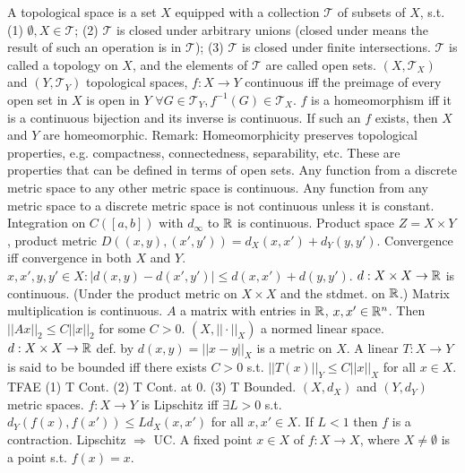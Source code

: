  A topological space is
a set $X$ equipped with a collection $\mathcal{T}$ of subsets of $X$, s.t.
(1) $\emptyset, X \in \mathcal{T}$;
(2) $\mathcal{T}$ is closed under arbitrary unions (closed under means the result of such an operation is in $\mathcal{T}$);
(3) $\mathcal{T}$ is closed under finite intersections.
$\mathcal{T}$ is called a topology on $X$, and the elements of $\mathcal{T}$ are called open sets.
$(X, \mathcal{T}_X)$ and $(Y, \mathcal{T}_Y)$ topological spaces,
$f: X \to Y$ continuous iff the preimage of every open set in $X$ is open in $Y$
$\forall G \in \mathcal{T}_Y, f^{-1}(G) \in \mathcal{T}_X$.
 $f$ is a homeomorphism iff
it is a continuous bijection and its inverse is continuous.
If such an $f$ exists, then $X$ and $Y$ are homeomorphic.
Remark: Homeomorphicity preserves topological properties,
e.g. compactness, connectedness, separability, etc.
These are properties that can be defined in terms of open sets.
 Any function from a discrete metric space to any other metric space is continuous.
 Any function from any metric space to a discrete metric space is not continuous unless it is constant.
 Integration on $C([a,b])$ with $d_\infty$ to $\mathbb{R}$ is continuous.
 Product space $Z = X \times Y$, product metric $D((x,y), (x',y')) = d_X(x,x') + d_Y(y,y')$.
Convergence iff convergence in both $X$ and $Y$.
 $x, x', y, y' \in X: |d(x,y) - d(x',y')| \leq d(x,x') + d(y,y')$.
 $d: X \times X \to \mathbb{R}$ is continuous. (Under the product metric on $X \times X$ and the stdmet. on $\mathbb{R}$.)
Matrix multiplication is continuous.
$A$ a matrix with entries in $\mathbb{R}$, $x, x' \in \mathbb{R}^n$.
Then $||Ax||_2 \leq C||x||_2$ for some $C > 0$.
$(X, ||\cdot||_X)$ a normed linear space.
$d: X \times X \to \mathbb{R}$ def. by $d(x,y) = ||x-y||_X$ is a metric on $X$.
A linear  $T: X \to Y$ is said to be bounded iff
there exists $C > 0$ s.t. $||T(x)||_Y \leq C||x||_X$ for all $x \in X$.
 TFAE
(1) T Cont.
(2) T Cont. at $0$.
(3) T Bounded.
$(X, d_X)$ and $(Y, d_Y)$ metric spaces.
$f: X \to Y$ is Lipschitz iff
$\exists L > 0$ s.t. $d_Y(f(x), f(x')) \leq Ld_X(x,x')$ for all $x, x' \in X$.
If $L < 1$ then $f$ is a contraction.
 Lipschitz $\Rightarrow$ UC.
A fixed point $x \in X$ of $f: X \to X$, where $X \neq \emptyset$ is a point s.t. $f(x) = x$.
